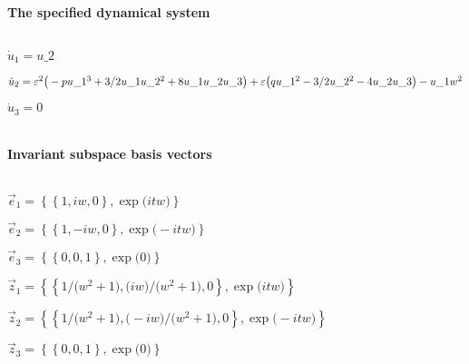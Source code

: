 \(\)
\paragraph{The specified dynamical system}
\(
\)\par
\(\dot u_{1}=u\_2
\)\par
\(\dot u_{2}=\varepsilon^{2} \big(-p u\_1^{3}+3/2 u\_1 u\_2^{2}+8 u\_1 u\_2 u\_3
\big)+\varepsilon \big(q u\_1^{2}-3/2 u\_2^{2}-4 u\_2 u\_3\big)-u\_1 w^{2}
\)\par

\(\dot u_{3}=0
\)\par
\(\)
\paragraph{Invariant subspace basis vectors}
\(
\)\par
\(\vec e_{1}=\left\{
\left\{
1 , i w , 0
\right\} , \exp \big(i t w\big)
\right\}
\)\par
\(\vec e_{2}=\left\{
\left\{
1 , -i w , 0
\right\} , \exp \big(-i t w\big)
\right\}
\)\par
\(\vec e_{3}=\left\{
\left\{
0 , 0 , 1
\right\} , \exp \big(0\big)
\right\}
\)\par
\(\vec z_{1}=\left\{
\left\{
1/\big(w^{2}+1\big) , \big(i w\big)/\big(w^{2}+1\big) , 0
\right\} , 
\exp \big(i t w\big)
\right\}
\)\par
\(\vec z_{2}=\left\{
\left\{
1/\big(w^{2}+1\big) , \big(-i w\big)/\big(w^{2}+1\big) , 0
\right\} , 
\exp \big(-i t w\big)
\right\}
\)\par
\(\vec z_{3}=\left\{
\left\{
0 , 0 , 1
\right\} , \exp \big(0\big)
\right\}
\)\par
